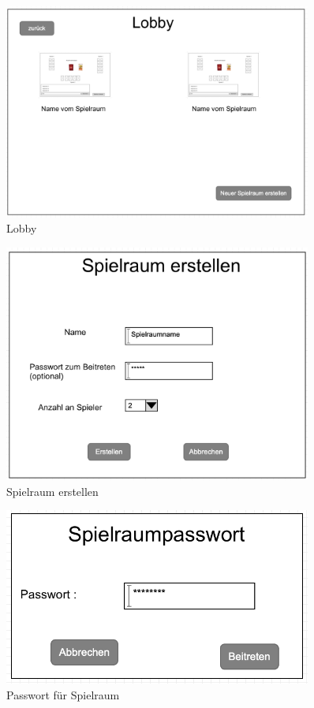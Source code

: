 \begin{figure}
	\centering
	\includegraphics[width=0.9\textwidth]{img/Lobby}
	\caption{Lobby}
	\label{gui:lobby}
\end{figure}

\begin{figure}
	\centering
	\includegraphics[width=0.9\textwidth]{img/Spielraumerstellen}
	\caption{Spielraum erstellen}
	\label{gui:erstellung}
\end{figure}

\begin{figure}
	\centering
	\includegraphics[width=0.9\textwidth]{img/Spielraumpasswort}
	\caption{Passwort für Spielraum}
	\label{gui:passwortspielraum}
\end{figure}


